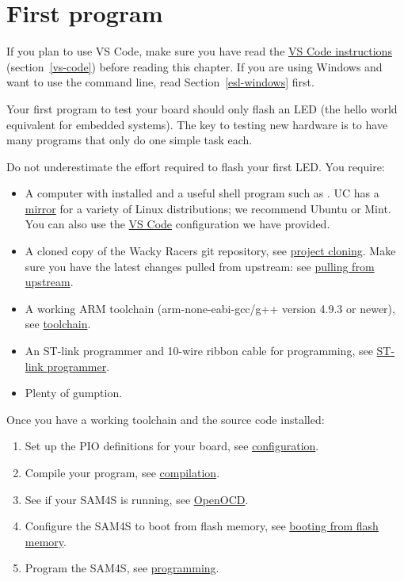 \chapter{First program}
\label{first-program}

If you plan to use VS Code, make sure you have read the
\hyperref[vs-code]{VS Code instructions} (section~\ref{vs-code}) before
reading this chapter. If you are using Windows and want to use the
command line, read Section~\ref{esl-windows} first.

Your first program to test your board should only flash an LED (the
hello world equivalent for embedded systems). The key to testing new
hardware is to have many programs that only do one simple task each.

Do not underestimate the effort required to flash your first LED. You
require:
%
\begin{itemize}
\item
  A computer with  installed and a useful shell program
  such as . UC has a
  \href{http://ucmirror.canterbury.ac.nz/}{mirror} for a variety of
  Linux distributions; we recommend Ubuntu or Mint. You can also use
  the \hyperref[vs-code]{VS Code} configuration we have provided.

\item A cloned copy of the Wacky Racers git repository, see
  \hyperref[project-cloning]{project cloning}. Make sure you have the
  latest changes pulled from upstream: see
  \hyperref[git-pulling-from-upstream]{pulling from upstream}.

\item
  A working ARM toolchain (arm-none-eabi-gcc/g++ version 4.9.3 or
  newer), see \hyperref[toolchain]{toolchain}.

\item
  An ST-link programmer and 10-wire ribbon cable for programming,
  see \hyperref[ST-link]{ST-link programmer}.

\item
  Plenty of gumption.
\end{itemize}


Once you have a working toolchain and the source code installed:
%
\begin{enumerate}
\item Set up the PIO definitions for your board, see
  \hyperref[configuration]{configuration}.

\item Compile your program, see \hyperref[compilation]{compilation}.

\item See if your SAM4S is running, see \hyperref[openocd]{OpenOCD}.

\item Configure the SAM4S to boot from flash memory, see
  \hyperref[booting-from-flash-memory]{booting from flash memory}.

\item Program the SAM4S, see \hyperref[programming]{programming}.
\end{enumerate}


